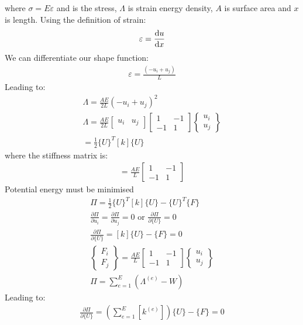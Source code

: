 \documentclass[class=report, crop=false, 12pt,a4paper]{standalone}
\begin{document}
where $\sigma = E\varepsilon$ and is the stress, $\Lambda$ is strain energy density, $A$ is surface area and $x$ is length. Using the definition of strain:
\begin{gather}
	\varepsilon = \frac{\dif u}{\dif x}
\end{gather}
We can differentiate our shape function:
\begin{gather}
	\varepsilon = \frac{\left(-u_i + u_j\right)}{L}
\end{gather}
Leading to:
\begin{gather}
	\Lambda = \frac{AE}{2L}\left(-u_i + u_j\right)^2\\
	\Lambda = \frac{AE}{2L}\begin{bmatrix}
		u_i & u_j
	\end{bmatrix}\begin{bmatrix}
		1 & -1\\
		-1 & 1
	\end{bmatrix}\begin{Bmatrix}
		u_i\\
		u_j
	\end{Bmatrix}\\
	= \frac{1}{2}\{U\}^T[k]\{U\}
\end{gather}
where the stiffness matrix is:
\begin{gather}
	[k] = \frac{AE}{L}\begin{bmatrix}
		1 & -1\\
		-1 & 1
	\end{bmatrix}
\end{gather}
Potential energy must be minimised
\begin{gather}
	\Pi = \frac{1}{2}\{U\}^T [k]\{U\} - \{U\}^T \{F\}\\
	\frac{\partial \Pi}{\partial u_i} = \frac{\partial \Pi}{\partial u_j} = 0 \textrm{ or } \frac{\partial \Pi}{\partial \{U\}} = 0\\
	\frac{\partial \Pi}{\partial \{U\}} = [k]\{U\} - \{F\} = 0\\
	\begin{Bmatrix}
		F_i\\
		F_j
	\end{Bmatrix} = \frac{AE}{L}\begin{bmatrix}
		1 & -1\\
		-1 & 1
	\end{bmatrix}\begin{Bmatrix}
		u_i\\
		u_j
	\end{Bmatrix}\\
	\Pi = \sum^E_{e=1}\left(\Lambda^{\left(e\right)}-W\right)
\end{gather}
Leading to:
\begin{gather}
	\frac{\partial \Pi}{\partial\{U\}} = \left(\sum^E_{e=1}\left[k^{\left(e\right)}\right]\right)\{U\}-\{F\} = 0
\end{gather}
\end{document}
